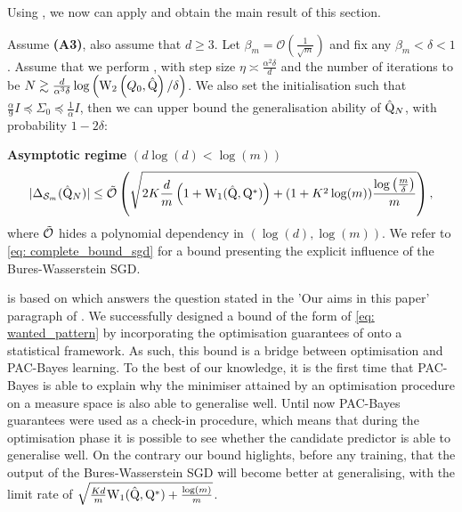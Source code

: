 Using , we now can apply  and obtain the main result of this section.
\begin{theorem}
\label{th: main_sgd}
Assume \textbf{(A3)}, also assume that $d\geq 3$. Let $\beta_m= \mathcal{O}(\frac{1}{\sqrt{m}})$ and fix any $\beta_m<\delta<1$.
Assume that we perform , with step size $\eta \asymp \frac{\alpha^2 \delta}{d}$ and the number of iterations to be $N \gtrsim \frac{d}{\alpha^3 \delta} \log \left(\mathrm{W}_{2}\left(Q_0, \hat{\mathrm{Q}}\right) / \delta\right)$.
We also set the initialisation such that $\frac{\alpha}{9} I \preceq \Sigma_{0} \preceq \frac{1}{\alpha} I$,
then we can upper bound the generalisation ability of $\hat{\mathrm{Q}}_N$, with probability $1-2\delta$:

\noindent \textbf{Asymptotic regime} $(d\log(d)< \log(m))$
\begin{align*}
|\Delta_{\mathcal{S}_m}(\hat{\mathrm{Q}}_N)|  \leq\Tilde{\mathcal{O}}\left( \sqrt{2K\frac{d}{m}\left(1 + \mathrm{W}_{1}(\hat{\mathrm{Q}},\mathrm{Q}^*)\right)+ (1+K^2\log(m)) \frac{\log\left( \frac{m}{\delta} \right)}{m}} \right),
\end{align*}
where $\Tilde{\mathcal{O}}$ hides a polynomial dependency in $(\log(d),\log(m))$. We refer to \eqref{eq: complete_bound_sgd} for a bound presenting the explicit influence of the Bures-Wasserstein SGD.
\end{theorem}
 is based on  which answers the question stated in the 'Our aims in this paper' paragraph of . We successfully designed a bound of the form of \eqref{eq: wanted_pattern} by incorporating the optimisation guarantees of \citet{lambert2022variational} onto a statistical framework.
As such, this bound is a bridge between optimisation and PAC-Bayes learning. To the best of our knowledge, it is the first time that PAC-Bayes is able to explain why the minimiser attained by an optimisation procedure on a measure space is also able to generalise well. Until now PAC-Bayes guarantees were used as a check-in procedure, which means that during the optimisation phase it is possible to see whether the candidate predictor is able to generalise well. On the contrary our bound higlights, before any training, that the output of the Bures-Wasserstein SGD will become better at generalising, with the limit rate of $\sqrt{\frac{Kd}{m}\mathrm{W}_{1}(\hat{\mathrm{Q}},\mathrm{Q}^*) + \frac{\log(m)}{m}}$.
\medskip

